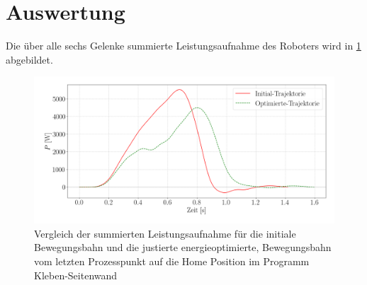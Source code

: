 \section{Auswertung}
Die über alle sechs Gelenke summierte Leistungsaufnahme des Roboters wird in \ref{fig:pup} abgebildet. 

\begin{figure}[tbph]
	\centering
	\includegraphics[width=1\linewidth]{images/P_up}
	\caption{Vergleich der summierten Leistungsaufnahme für die initiale Bewegungsbahn und die justierte energieoptimierte, Bewegungsbahn vom letzten Prozesspunkt auf die  Home Position im Programm Kleben-Seitenwand}
	\label{fig:pup}
\end{figure}

